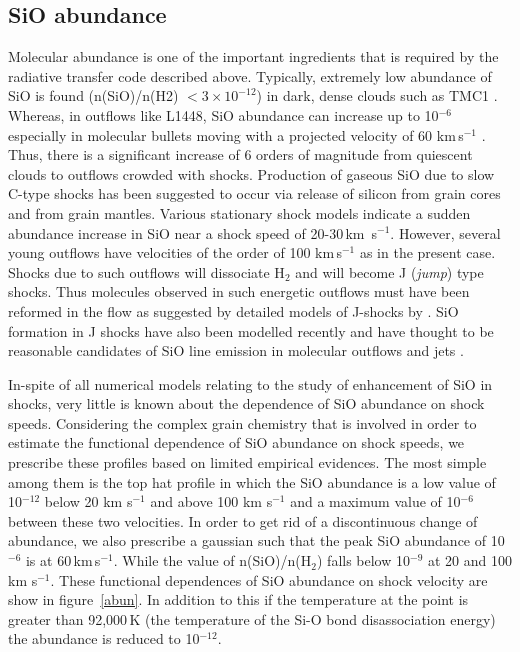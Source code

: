 \documentclass[useAMS,usenatbib]{mn2e}
\begin{document}
\subsection{SiO abundance}
\label{ssec:sioabun}
Molecular abundance is one of the important ingredients that is
required by the radiative transfer code described above. 
Typically, extremely low abundance of SiO is
found (n(SiO)/n(H2) $< 3\times10^{-12}$) in dark, dense clouds such
as TMC1 \citep{Ziurys:1989p14699,MartinPintado:1992p14309}. Whereas, in
outflows like L1448, SiO abundance can increase up to 10$^{-6}$ especially in
molecular bullets moving with a projected velocity of 60
km\,s$^{-1}$ \citep{Dutrey:1997p11185}. Thus, there is
a significant increase of 6 orders of magnitude from quiescent clouds
to outflows crowded with shocks. Production of
gaseous SiO due to slow C-type shocks has been suggested to occur via release of
silicon from grain cores and from grain mantles. Various stationary
shock models indicate a sudden abundance increase in SiO 
near a shock speed of 20-30\,km\, s$^{-1}$. However, several young
outflows have velocities of the order of 100 km\,s$^{-1}$ as in the present
case. Shocks due to such outflows will dissociate H$_{2}$ and will
become J ({\em{jump}}) type shocks. Thus molecules observed in such
energetic outflows must have been reformed in the flow as suggested by
detailed models of J-shocks by \cite{Neufeld:1989p14322}. SiO formation in J shocks
have also been modelled recently and have thought to be reasonable
candidates of SiO line emission in molecular outflows and jets
\citep{Guillet:2009p11229}.
%

In-spite of all numerical models relating to the study of enhancement
of SiO in shocks, very little is known about the dependence of SiO
abundance on shock speeds. Considering the complex grain
chemistry that is involved in order to estimate the functional
dependence of SiO abundance on shock speeds, we prescribe these
profiles based on limited empirical evidences. The most simple among
them is the top hat profile in which the SiO abundance is a low value of
10$^{-12}$ below 20 km s$^{-1}$ and above 100 km s$^{-1}$ and a
maximum value of 10$^{-6}$ between these two velocities.
In order to get rid of a discontinuous change of abundance, we also
prescribe a gaussian such that the peak SiO abundance of 10$^{-6}$ is at
60\,km\,s$^{-1}$. While the value of n(SiO)/n(H$_{2}$) falls below
10$^{-9}$ at 20 and 100 km s$^{-1}$. These functional dependences of SiO
abundance on shock velocity are show in figure~\ref{abun}.  
In addition to this if the temperature at the point is greater than
92,000\,K (the temperature of the Si-O bond disassociation energy) 
the abundance is reduced to 10$^{-12}$. 
%
\end{document}
